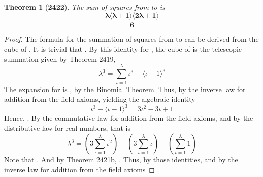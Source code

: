 \documentclass[preview]{standalone}
\newtheorem{theorem}{Theorem}
\begin{document}
\begin{theorem}[\textbf{2422}]
    The sum of squares from  to \bm{$\lambda$} is 
    \begin{equation*}
        \bm{
            \frac{ 
                \lambda 
                \langle \lambda + 1 \rangle 
                \langle 2 \lambda + 1 \rangle 
            }
            {6}
        }
    \end{equation*}
\end{theorem}

\begin{proof}
    The formula for the summation of squares 
    from  to \bm{$\lambda$} 
    can be derived from the cube of \bm{$\lambda$}.
    It is trivial that 
    . 
    By this identity for \bm{$\lambda$},
    the cube of \bm{$\lambda$} is the telescopic summation given by Theorem 2419, 
    \begin{equation*}
        \lambda ^3 
            = 
        \sum_{\iota=1}^\lambda \iota ^3 - \big \langle \iota - 1 \big \rangle ^3    
    \end{equation*}
    The expansion for 
    is 
    , 
    by the Binomial Theorem. 
    Thus, 
    by the inverse law for addition from the field axioms,
    yielding the algebraic identity
    \begin{equation*}
        \iota ^3 - \big \langle \iota - 1 \big \rangle ^3 
            = 
        3 \iota ^2 - 3 \iota + 1
    \end{equation*}
    Hence, 
    .
    By the commutative law for addition from the field axioms, 
    and by the distributive law for real numbers,
    that is
    \begin{equation*}
        \lambda ^3 
            = 
        \left( 3 \sum_{\iota=1}^\lambda \iota ^2 \right) 
            - 
        \left( 3 \sum_{\iota=1}^\lambda \iota \right) 
            + 
        \left( \sum_{\iota=1}^\lambda 1 \right)
    \end{equation*}
    Note that . 
    And by Theorem 2421b, 
    . 
    Thus, 
    by those identities, 
    and by the inverse law for addition from the field axioms

\end{proof}
\end{document}
